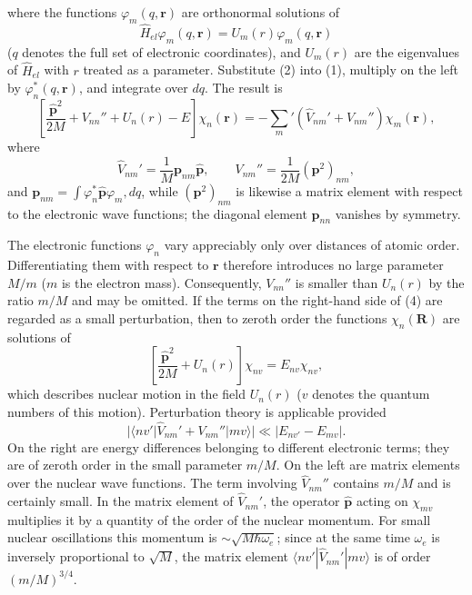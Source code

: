 where the functions $\varphi_m(q,\mathbf r)$ are orthonormal solutions of
\begin{equation}\widehat H_{el}\varphi_m(q,\mathbf r)=U_m(r)\varphi_m(q,\mathbf r)\tag{3}\end{equation}
($q$ denotes the full set of electronic coordinates), and $U_m(r)$ are the eigenvalues of $\widehat H_{el}$ with $r$ treated as a parameter. Substitute (2) into (1), multiply on the left by $\varphi_n^*(q,\mathbf r)$, and integrate over $dq$. The result is
\begin{equation}\left[\frac{\widehat{\mathbf p}^{2}}{2M}+V_{nn}''+U_n(r)-E\right]\chi_n(\mathbf r)=-\sum_m'(\widehat V_{nm}'+V_{nm}'')\chi_m(\mathbf r),\tag{4}\end{equation}
where
\[\widehat V_{nm}'=\frac1M\mathbf p_{nm}\widehat{\mathbf p},\qquad V_{nm}''=\frac1{2M}(\mathbf p^2)_{nm},\]
and $\mathbf p_{nm}=\int\varphi_n^*\widehat{\mathbf p}\varphi_m,dq$, while $(\mathbf p^2)_{nm}$ is likewise a matrix element with respect to the electronic wave functions; the diagonal element $\mathbf p_{nn}$ vanishes by symmetry.

The electronic functions $\varphi_n$ vary appreciably only over distances of atomic order. Differentiating them with respect to $\mathbf r$ therefore introduces no large parameter $M/m$ ($m$ is the electron mass). Consequently, $V_{nn}''$ is smaller than $U_n(r)$ by the ratio $m/M$ and may be omitted. If the terms on the right-hand side of (4) are regarded as a small perturbation, then to zeroth order the functions $\chi_n(\mathbf R)$ are solutions of
\begin{equation}\left[\frac{\widehat{\mathbf p}^{2}}{2M}+U_n(r)\right]\chi_{nv}=E_{nv}\chi_{nv},\tag{5}\end{equation}
which describes nuclear motion in the field $U_n(r)$ ($v$ denotes the quantum numbers of this motion). Perturbation theory is applicable provided
\[|\langle nv'|\widehat V_{nm}'+V_{nm}''|mv\rangle|\ll|E_{nv'}-E_{mv}|.\]
On the right are energy differences belonging to different electronic terms; they are of zeroth order in the small parameter $m/M$. On the left are matrix elements over the nuclear wave functions. The term involving $\widehat V_{nm}''$ contains $m/M$ and is certainly small. In the matrix element of $\widehat V_{nm}'$, the operator $\widehat{\mathbf p}$ acting on $\chi_{mv}$ multiplies it by a quantity of the order of the nuclear momentum. For small nuclear oscillations this momentum is $\sim\sqrt{M\hbar\omega_e}$; since at the same time $\omega_e$ is inversely proportional to $\sqrt M$, the matrix element $\langle nv'|\widehat V_{nm}'|mv\rangle$ is of order $(m/M)^{3/4}$.
